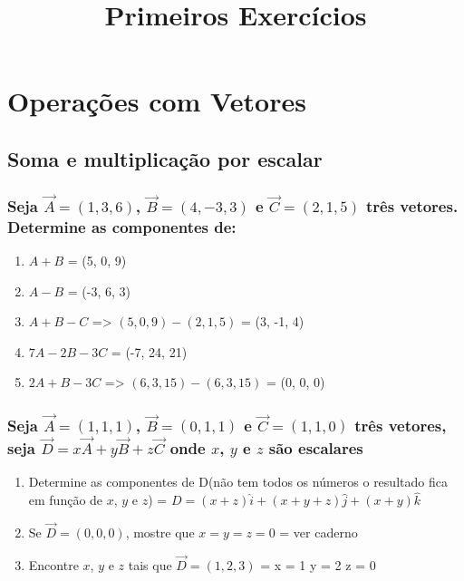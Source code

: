 \documentclass[a4paper,10pt]{article}
\title{Primeiros Exercícios}
\author{}
\begin{document}
\maketitle

\section{Operações com Vetores}

\subsection{Soma e multiplicação por escalar}

\subsubsection{Seja $\vec{A}=(1,3,6)$, $\vec{B}=(4,-3,3)$ e $\vec{C}=(2,1,5)$ três vetores. Determine as componentes de:}

\begin{enumerate}
 \item $A + B$ = 
 (5, 0, 9) 
 
 \item $A - B$ = 
 (-3, 6, 3)
 
 \item $A + B - C$ =>
  $(5, 0, 9) - (2, 1, 5)$ = (3, -1, 4)
 
 \item $7A - 2B - 3C$ = 
 (-7, 24, 21)
 
 \item $2A + B - 3C$ => 
 $(6, 3, 15) - (6, 3, 15)$ = (0, 0, 0)

\end{enumerate}

\subsubsection{Seja $\vec{A}=(1,1,1)$, $\vec{B}=(0,1,1)$ e $\vec{C}=(1,1,0)$ três vetores, seja 
$\vec{D}=x\vec{A} + y\vec{B} + z\vec{C}$ onde $x$, $y$ e $z$ são escalares}


\begin{enumerate}
 \item Determine as componentes de D(não tem todos os números o resultado fica em função de $x$, $y$ e $z$) =  
 $D = (x + z)\hat{i} + (x + y + z)\hat{j} + (x + y)\hat{k}$
 
 
  
 \item Se $\vec{D}=(0,0,0)$, mostre que $x=y=z=0$ =  
 ver caderno
 
 \item Encontre $x$, $y$ e $z$ tais que $\vec{D}=(1,2,3)$ = 
 x = 1
 y = 2
 z = 0
 
\end{enumerate}
\end{document}
